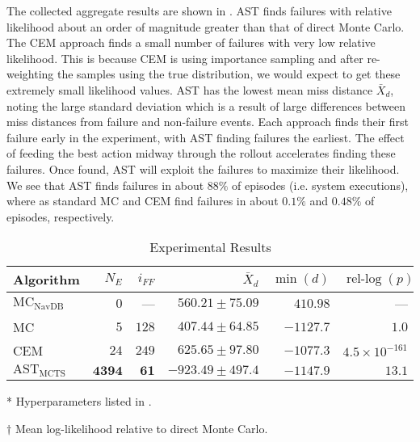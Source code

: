 The collected aggregate results are shown in .
AST finds failures with relative likelihood about an order of magnitude greater than that of direct Monte Carlo.
The CEM approach finds a small number of failures with very low relative likelihood.
This is because CEM is using importance sampling and after re-weighting the samples using the true distribution, we would expect to get these extremely small likelihood values.
AST has the lowest mean miss distance $\bar{X}_d$, noting the large standard deviation which is a result of large differences between miss distances from failure and non-failure events.
Each approach finds their first failure early in the experiment, with AST finding failures the earliest.
The effect of feeding the best action midway through the rollout accelerates finding these failures.
Once found, AST will exploit the failures to maximize their likelihood.
We see that AST finds failures in about $88\%$ of episodes (i.e. system executions), where as standard MC and CEM find failures in about $0.1\%$ and $0.48\%$ of episodes, respectively.




\begin{table}[!ht]
  \centering
  \caption{\label{tab:results} Experimental Results}
  \begin{threeparttable}
  \begin{tabular}{@{}lrrrrr@{}}
    \toprule
    Algorithm\tnote{*} & $N_E$ & $i_{FF}$ & $\bar{X}_d$ & $\min(d)$ & $\operatorname{rel-log}(p)$\tnote{$\dagger$}\\
    \midrule
    $\text{MC}_\text{NavDB}$ & $0$          & ---        & $560.21 \pm75.09$       & $410.98$         & ---\\
    MC                       & $5$          & $128$        & $407.44 \pm64.85$       & $-1127.7$      & $1.0$\\
    CEM                      & $24$         & $249$        & $625.65 \pm97.80$        & $-1077.3$      & $4.5\times 10^{-161}$\\
    $\text{AST}_\text{MCTS}$ & $\bm{4394}$ & $\bm{61}$ & $\bm{-923.49 \pm497.4}$ & $\bm{-1147.9}$ & $\bm{13.1}$\\
    \bottomrule
  \end{tabular}
  \begin{tablenotes}
      \item[*] {Hyperparameters listed in .}
      \item[$\dagger$] {Mean log-likelihood relative to direct Monte Carlo.}
  \end{tablenotes}
  \end{threeparttable}
\end{table}




